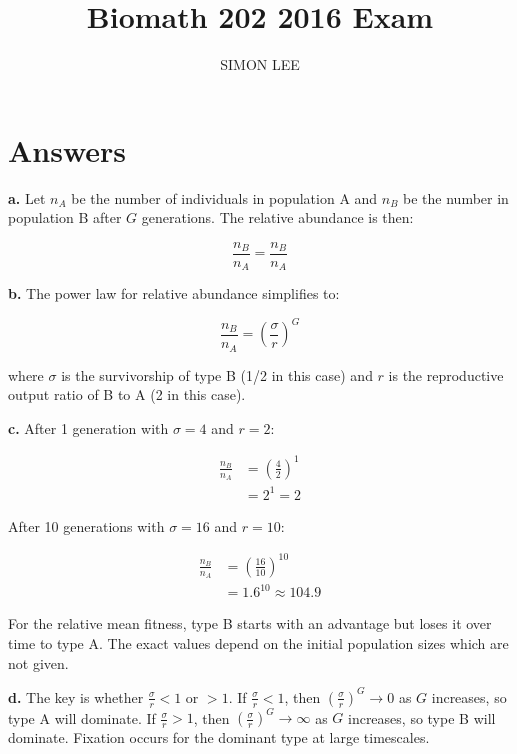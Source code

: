 \documentclass{article}
\title{Biomath 202 2016 Exam}
\author{SIMON LEE}
\date{}
\begin{document}
\maketitle

\section{Answers}

\textbf{a.} Let $n_A$ be the number of individuals in population A and $n_B$ be the number in population B after $G$ generations. The relative abundance is then:

\begin{equation*}
\frac{n_B}{n_A} = \frac{n_B}{n_A}
\end{equation*}

\textbf{b.} The power law for relative abundance simplifies to:

\begin{equation*}
\frac{n_B}{n_A} = \left(\frac{\sigma}{r}\right)^G
\end{equation*}

where $\sigma$ is the survivorship of type B (1/2 in this case) and $r$ is the reproductive output ratio of B to A (2 in this case).

\textbf{c.} After 1 generation with $\sigma=4$ and $r=2$:

\begin{align*}
\frac{n_B}{n_A} &= \left(\frac{4}{2}\right)^1 \\
                &= 2^1 = 2
\end{align*}

After 10 generations with $\sigma=16$ and $r=10$:

\begin{align*}
\frac{n_B}{n_A} &= \left(\frac{16}{10}\right)^{10} \\
                &= 1.6^{10} \approx 104.9
\end{align*}

For the relative mean fitness, type B starts with an advantage but loses it over time to type A. The exact values depend on the initial population sizes which are not given.

\textbf{d.} The key is whether $\frac{\sigma}{r} < 1$ or $> 1$. If $\frac{\sigma}{r} < 1$, then $(\frac{\sigma}{r})^G \to 0$ as $G$ increases, so type A will dominate. If $\frac{\sigma}{r} > 1$, then $(\frac{\sigma}{r})^G \to \infty$ as $G$ increases, so type B will dominate. Fixation occurs for the dominant type at large timescales.
\end{document}
